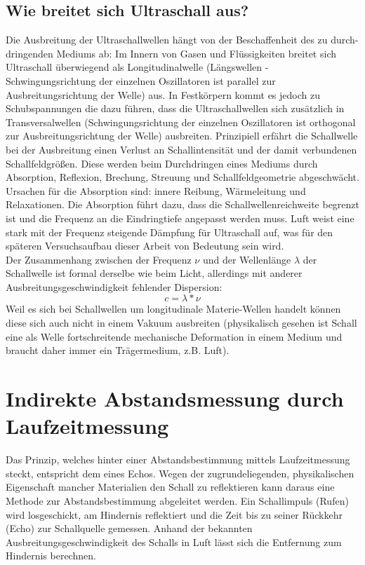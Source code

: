 \subsection{Wie breitet sich Ultraschall aus?}
Die Ausbreitung der Ultraschallwellen hängt von der Beschaffenheit des zu durch-dringenden Mediums ab: Im Innern von Gasen und Flüssigkeiten breitet sich Ultraschall überwiegend als Longitudinalwelle (Längswellen - Schwingungsrichtung der einzelnen Oszillatoren ist parallel zur Ausbreitungsrichtung der Welle) aus. In Festkörpern kommt es jedoch zu Schubspannungen die dazu führen, dass die Ultraschallwellen sich zusätzlich in Transversalwellen (Schwingungsrichtung der einzelnen Oszillatoren ist orthogonal zur Ausbreitungsrichtung der Welle) ausbreiten.
Prinzipiell erfährt die Schallwelle bei der Ausbreitung einen Verlust an Schallintensität und der damit verbundenen Schallfeldgrößen. Diese werden beim Durchdringen eines Mediums durch Absorption, Reflexion, Brechung, Streuung und Schallfeldgeometrie abgeschwächt. Ursachen für die Absorption sind: innere Reibung, Wärmeleitung und Relaxationen. Die Absorption führt dazu, dass die Schallwellenreichweite begrenzt ist und die Frequenz an die Eindringtiefe angepasst werden muss. Luft weist eine stark mit der Frequenz steigende Dämpfung für Ultraschall auf, was für den späteren Versuchsaufbau dieser Arbeit von Bedeutung sein wird. \\
Der Zusammenhang zwischen der Frequenz $\nu $ und der Wellenlänge $\lambda$ der Schallwelle ist formal derselbe wie beim Licht, allerdings mit anderer Ausbreitungsgeschwindigkeit fehlender Dispersion:
\begin{equation}
c=\lambda*\nu
\end{equation}
Weil es sich bei Schallwellen um longitudinale Materie-Wellen handelt können diese sich auch nicht in einem Vakuum ausbreiten (physikalisch gesehen ist Schall eine als Welle fortschreitende mechanische Deformation in einem Medium und braucht daher immer ein Trägermedium, z.B. Luft). 


\section{Indirekte Abstandsmessung durch Laufzeitmessung}
Das Prinzip, welches hinter einer Abstandsbestimmung mittels Laufzeitmessung steckt, entspricht dem eines Echos. Wegen der zugrundeliegenden, physikalischen Eigenschaft mancher Materialien den Schall zu reflektieren kann daraus eine Methode zur Abstandsbestimmung abgeleitet werden. Ein Schallimpuls (Rufen) wird losgeschickt, am Hindernis reflektiert und die Zeit bis zu seiner Rückkehr (Echo) zur Schallquelle gemessen. Anhand der bekannten Ausbreitungsgeschwindigkeit des Schalls in Luft lässt sich die Entfernung zum Hindernis berechnen.


